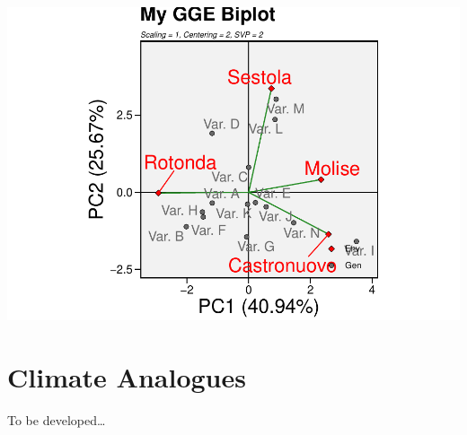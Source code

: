 \documentclass[
]{book}
\begin{document}
\includegraphics{PPB-Toolkit-for-R-and-R-Studio_files/figure-latex/ggeedited-1.pdf}

\hypertarget{climate-analogues}{%
\chapter{Climate Analogues}\label{climate-analogues}}

To be developed\ldots{}

  
\end{document}
